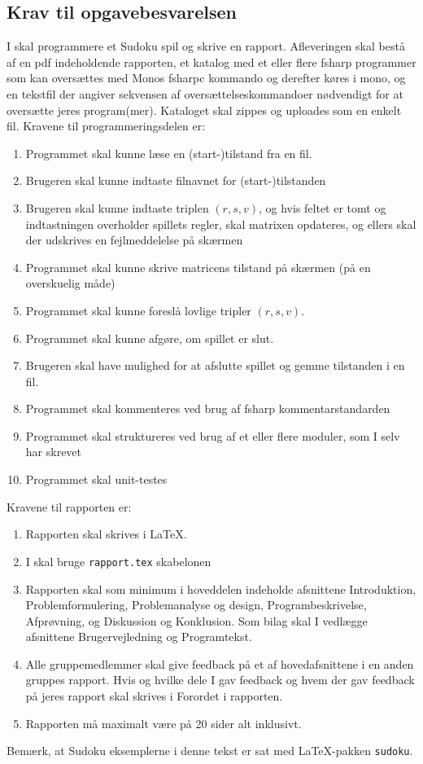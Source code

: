 \documentclass[a4paper,12pt]{article}
\begin{document}
\subsection*{Krav til opgavebesvarelsen}
I skal programmere et Sudoku spil og skrive en rapport. Afleveringen skal bestå af en pdf indeholdende rapporten, et katalog med et eller flere fsharp programmer som kan oversættes med Monos fsharpc kommando og derefter køres i mono, og en tekstfil der angiver sekvensen af oversættelseskommandoer nødvendigt for at oversætte jeres program(mer). Kataloget skal zippes og uploades som en enkelt fil. Kravene til programmeringsdelen er:
\begin{enumerate}
\item Programmet skal kunne læse en (start-)tilstand fra en fil.
\item Brugeren skal kunne indtaste filnavnet for (start-)tilstanden
\item Brugeren skal kunne indtaste triplen $(r,s,v)$, og hvis feltet er tomt og indtastningen overholder spillets regler, skal matrixen opdateres, og ellers skal der udskrives en fejlmeddelelse på skærmen
\item Programmet skal kunne skrive matricens tilstand på skærmen (på en overskuelig måde)
\item Programmet skal kunne foreslå lovlige tripler $(r,s,v)$.
\item Programmet skal kunne afgøre, om spillet er slut.
\item Brugeren skal have mulighed for at afslutte spillet og gemme tilstanden i en fil.
\item Programmet skal kommenteres ved brug af fsharp kommentarstandarden
\item Programmet skal struktureres ved brug af et eller flere moduler, som I selv har skrevet
\item Programmet skal unit-testes
\end{enumerate}
Kravene til rapporten er:
\begin{enumerate}[resume]
\item Rapporten skal skrives i \LaTeX.
\item I skal bruge \texttt{rapport.tex} skabelonen
\item Rapporten skal som minimum i hoveddelen indeholde afsnittene Introduktion, Problemformulering, Problemanalyse og design, Programbeskrivelse, Afprøvning, og Diskussion og Konklusion. Som bilag skal I vedlægge afsnittene Brugervejledning og Programtekst.
\item Alle gruppemedlemmer skal give feedback på et af hovedafsnittene i en anden gruppes rapport. Hvis og hvilke dele I gav feedback og hvem der gav feedback på jeres rapport skal skrives i Forordet i rapporten.
\item Rapporten må maximalt være på 20 sider alt inklusivt.
\end{enumerate}
Bemærk, at Sudoku eksemplerne i denne tekst er sat med \LaTeX-pakken \texttt{sudoku}.
\end{document}
